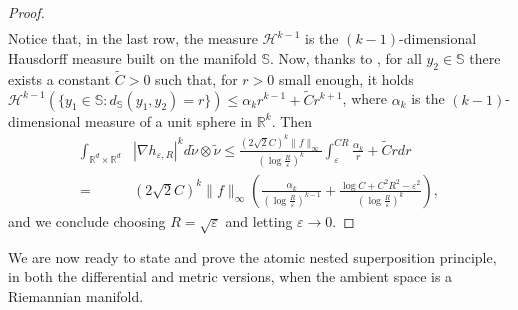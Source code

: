 \documentclass[10pt,leqno]{amsart}
\numberwithin{equation}{section}
\newcommand{\R}{\mathbb{R}}
\newcommand{\Ss}{\mathbb{S}}
\begin{document}
\begin{proof}
\begin{align*}
    \end{align*}
    Notice that, in the last row, the measure $\mathcal{H}^{k-1}$ is the $(k-1)$-dimensional Hausdorff measure built on the manifold $\Ss$. Now, thanks to \cite[Equation (11)]{volume1974gray}, for all $y_2\in \Ss$ there exists a constant $\tilde{C}>0$ such that, for $r>0$ small enough, it holds $\mathcal{H}^{k-1}(\{y_1\in \Ss : d_\Ss(y_1,y_2) = r\}) \leq \alpha_{k} r^{k-1} + \tilde{C}r^{k+1}$, where $\alpha_k$ is the $(k-1)$-dimensional measure of a unit sphere in $\R^k$. Then 
    \begin{align*}
         \int_{\R^d \times \R^d} &|\nabla h_{\varepsilon,R}|^k d\tilde{\nu}\otimes \tilde{\nu} \leq \frac{(2\sqrt{2}C)^k\|f\|_\infty}{ \left( \log \frac{R}{\varepsilon} \right)^k} \int_\varepsilon^{CR} \frac{\alpha_k}{r} + \tilde{C}r dr 
         \\
         = & (2\sqrt{2}C)^k\|f\|_\infty \left(\frac{\alpha_k}{ \left( \log \frac{R}{\varepsilon} \right)^{k-1}} + \frac{\log C + C^2R^2 - \varepsilon^2}{ \left( \log \frac{R}{\varepsilon} \right)^k}\right),
    \end{align*}
    and we conclude choosing $R = \sqrt{\varepsilon}$ and letting $\varepsilon \to 0$.
\end{proof}


We are now ready to state and prove the atomic nested superposition principle, in both the differential and metric versions, when the ambient space is a Riemannian manifold.
\end{document}
